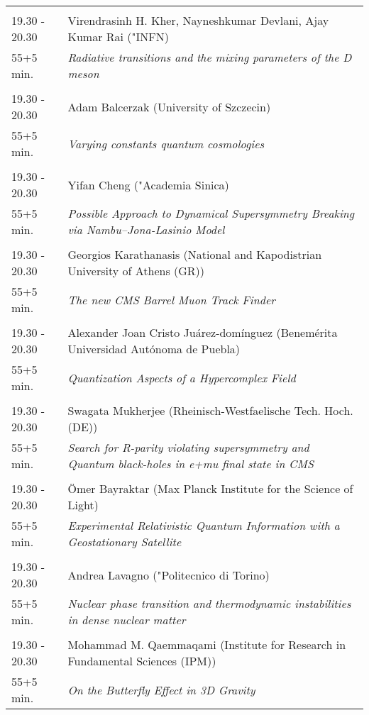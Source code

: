 \begin{longtable}{p{3cm}p{13cm}}
 & \\ 
19.30 - 20.30 & Virendrasinh H. Kher, Nayneshkumar Devlani, Ajay Kumar Rai ("INFN)\\ 
55+5 min. & {\it Radiative transitions and the mixing parameters of the D meson}\\ 
 & \\ 
19.30 - 20.30 & Adam Balcerzak (University of Szczecin)\\ 
55+5 min. & {\it Varying constants quantum cosmologies}\\ 
 & \\ 
19.30 - 20.30 & Yifan Cheng ("Academia Sinica)\\ 
55+5 min. & {\it Possible Approach to Dynamical Supersymmetry Breaking via Nambu--Jona-Lasinio Model}\\ 
 & \\ 
19.30 - 20.30 & Georgios Karathanasis (National and Kapodistrian University of Athens (GR))\\ 
55+5 min. & {\it The new CMS Barrel Muon Track Finder}\\ 
 & \\ 
19.30 - 20.30 & Alexander Joan Cristo Juárez-domínguez (Benemérita Universidad Autónoma de Puebla)\\ 
55+5 min. & {\it Quantization Aspects of a Hypercomplex Field}\\ 
 & \\ 
19.30 - 20.30 & Swagata Mukherjee (Rheinisch-Westfaelische Tech. Hoch. (DE))\\ 
55+5 min. & {\it Search for R-parity violating supersymmetry and Quantum black-holes in e+mu final state in CMS}\\ 
 & \\ 
19.30 - 20.30 & Ömer Bayraktar (Max Planck Institute for the Science of Light)\\ 
55+5 min. & {\it Experimental Relativistic Quantum Information with a Geostationary Satellite}\\ 
 & \\ 
19.30 - 20.30 & Andrea Lavagno ("Politecnico di Torino)\\ 
55+5 min. & {\it Nuclear phase transition and thermodynamic instabilities in dense nuclear matter}\\ 
 & \\ 
19.30 - 20.30 & Mohammad M. Qaemmaqami (Institute for Research in Fundamental Sciences (IPM))\\ 
55+5 min. & {\it On the Butterfly Effect in 3D Gravity}\\ 

\end{longtable}
